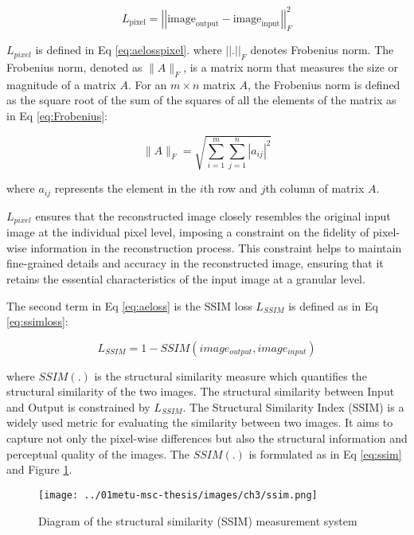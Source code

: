 \begin{equation}\label{eq:aelosspixel}
    L_{\text{pixel}} = \left\lvert \left\lvert\text{image}_{\text{output}} - \text{image}_{\text{input}} \right\rvert \right\rvert _{F}^{2}
\end{equation}

$L_{pixel}$ is defined in Eq \ref{eq:aelosspixel}. where $\left\lvert \left\lvert\text{.} \right\rvert \right\rvert _{F}$ denotes Frobenius norm. The Frobenius norm, denoted as $\|A\|_F$, is a matrix norm that measures the size or magnitude of a matrix $A$. For an $m \times n$ matrix $A$, the Frobenius norm is defined as the square root of the sum of the squares of all the elements of the matrix as in Eq \ref{eq:Frobenius}:

\begin{equation}\label{eq:Frobenius}
    \|A\|_F = \sqrt{\sum_{i=1}^{m} \sum_{j=1}^{n} |a_{ij}|^2}
\end{equation}

where $a_{ij}$ represents the element in the $i$th row and $j$th column of matrix $A$.

$L_{pixel}$ ensures that the reconstructed image closely resembles the original input image at the individual pixel level, imposing a constraint on the fidelity of pixel-wise information in the reconstruction process. This constraint helps to maintain fine-grained details and accuracy in the reconstructed image, ensuring that it retains the essential characteristics of the input image at a granular level. 

The second term in Eq \ref{eq:aeloss} is the SSIM loss $L_{SSIM}$ is defined as in Eq \ref{eq:ssimloss}:

\begin{equation}\label{eq:ssimloss}
    L_{SSIM} = 1- SSIM(image_{output},image_{input})
\end{equation}

where $SSIM(.)$ is the structural similarity measure \cite{ma2015perceptual} which quantifies the structural similarity of the two images. The structural similarity between Input and Output is constrained by
$L_{SSIM}$. The Structural Similarity Index (SSIM) is a widely used metric for evaluating the similarity between two images. It aims to capture not only the pixel-wise differences but also the structural information and perceptual quality of the images. The $SSIM(.)$ is formulated as in Eq \ref{eq:ssim} and Figure \ref{fig:ch3:ssim}.

\begin{figure}[htbp]
    \centering
    \texttt{[image: ../01metu-msc-thesis/images/ch3/ssim.png]}
    \caption{Diagram of the structural similarity (SSIM) measurement system \cite{ma2015perceptual}}
    \label{fig:ch3:ssim}
\end{figure}

